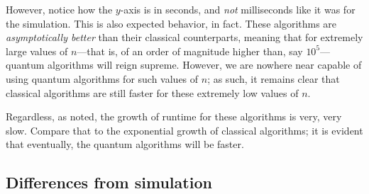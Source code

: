 \documentclass[12pt]{article}
\begin{document}

However, notice how the $y$-axis is in seconds, and \textit{not} milliseconds like it was for the simulation.
This is also expected behavior, in fact.
These algorithms are \textit{asymptotically better} than their classical counterparts, meaning that for extremely large values of $n$---that is, of an order of magnitude higher than, say $10^5$---quantum algorithms will reign supreme.
However, we are nowhere near capable of using quantum algorithms for such values of $n$; as such, it remains clear that classical algorithms are still faster for these extremely low values of $n$.

Regardless, as noted, the growth of runtime for these algorithms is very, very slow.
Compare that to the exponential growth of classical algorithms; it is evident that eventually, the quantum algorithms will be faster.


\subsection{Differences from simulation}
\end{document}
